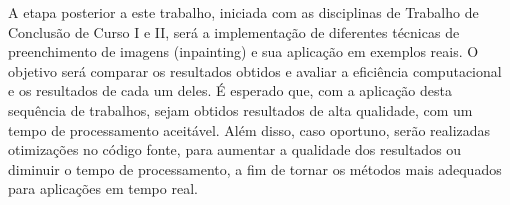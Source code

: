 A etapa posterior a este trabalho, iniciada com as disciplinas de Trabalho de Conclusão de Curso I e II, será a implementação de diferentes técnicas de preenchimento de imagens (inpainting) e sua aplicação em exemplos reais. O objetivo será comparar os resultados obtidos e avaliar a eficiência computacional e os resultados de cada um deles. É esperado que, com a aplicação desta sequência de trabalhos, sejam obtidos resultados de alta qualidade, com um tempo de processamento aceitável. Além disso, caso oportuno, serão realizadas otimizações no código fonte, para aumentar a qualidade dos resultados ou diminuir o tempo de processamento, a fim de tornar os métodos mais adequados para aplicações em tempo real.

